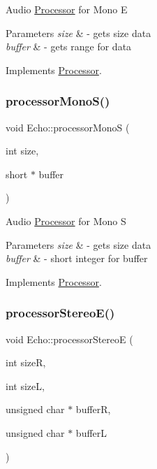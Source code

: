 Audio \hyperlink{classProcessor}{Processor} for Mono E 
\begin{DoxyParams}{Parameters}
{\em size} & -\/ gets size data \\
\hline
{\em buffer} & -\/ gets range for data \\
\hline
\end{DoxyParams}


Implements \hyperlink{classProcessor_aa9742b5df48a3c6442d521ce93012fc1}{Processor}.

\mbox{\label{classEcho_a298f9fe12295c578737928544c46be1a}} 
\subsubsection{\texorpdfstring{processor\+Mono\+S()}{processorMonoS()}}
{\footnotesize\ttfamily void Echo\+::processor\+MonoS (\begin{DoxyParamCaption}\item[{int}]{size,  }\item[{short $\ast$}]{buffer }\end{DoxyParamCaption})\hspace{0.3cm}{\ttfamily [virtual]}}

Audio \hyperlink{classProcessor}{Processor} for Mono S 
\begin{DoxyParams}{Parameters}
{\em size} & -\/ gets size data \\
\hline
{\em buffer} & -\/ short integer for buffer \\
\hline
\end{DoxyParams}


Implements \hyperlink{classProcessor_a4cf32c9f7e26383490e8fb49defcc287}{Processor}.

\mbox{\label{classEcho_a92aa2d47f32f5ad0f2cd45121e8d457f}} 
\subsubsection{\texorpdfstring{processor\+Stereo\+E()}{processorStereoE()}}
{\footnotesize\ttfamily void Echo\+::processor\+StereoE (\begin{DoxyParamCaption}\item[{int}]{sizeR,  }\item[{int}]{sizeL,  }\item[{unsigned char $\ast$}]{bufferR,  }\item[{unsigned char $\ast$}]{bufferL }\end{DoxyParamCaption})\hspace{0.3cm}{\ttfamily [virtual]}}


